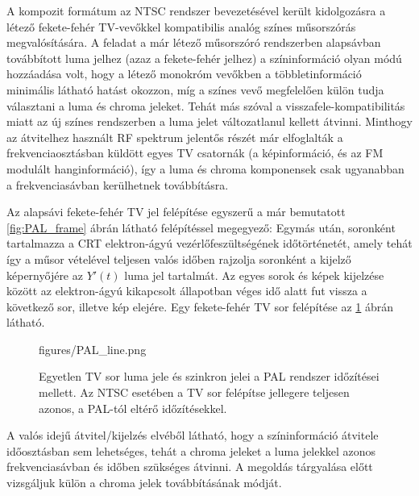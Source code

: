 A kompozit formátum az NTSC rendszer bevezetésével került kidolgozásra a létező fekete-fehér TV-vevőkkel kompatibilis analóg színes műsorszórás megvalósítására.
A feladat a már létező műsorszóró rendszerben alapsávban továbbított luma jelhez (azaz a fekete-fehér jelhez) a színinformáció olyan módú hozzáadása volt, hogy a létező monokróm vevőkben a többletinformáció minimális látható hatást okozzon, míg a színes vevő megfelelően külön tudja választani a luma és chroma jeleket.
Tehát más szóval a visszafele-kompatibilitás miatt az új színes rendszerben a luma jelet változatlanul kellett átvinni. 
Minthogy az átvitelhez használt RF spektrum jelentős részét már elfoglalták a frekvenciaosztásban küldött egyes TV csatornák (a képinformáció, és az FM modulált hanginformáció), így a luma és chroma komponensek csak ugyanabban a frekvenciasávban kerülhetnek továbbításra.

Az alapsávi fekete-fehér TV jel felépítése egyszerű a már bemutatott \ref{fig:PAL_frame} ábrán látható felépítéssel megegyező:
Egymás után, soronként tartalmazza a CRT elektron-ágyú vezérlőfeszültségének időtörténetét, amely tehát így a műsor vételével teljesen valós időben rajzolja soronként a kijelző képernyőjére az $Y'(t)$ luma jel tartalmát.
Az egyes sorok és képek kijelzése között az elektron-ágyú kikapcsolt állapotban véges idő alatt fut vissza a következő sor, illetve kép elejére. 
Egy fekete-fehér TV sor felépítése az \ref{Fig:PAL_line} ábrán látható.

%
\begin{figure}[]
	\centering
	\begin{minipage}[c]{0.65\textwidth}
	\begin{overpic}[width = 0.95\columnwidth ]{figures/PAL_line.png}
	\end{overpic} \end{minipage}\hfill
	\begin{minipage}[c]{0.35\textwidth}	\caption{Egyetlen TV sor luma jele és szinkron jelei a PAL rendszer időzítései mellett. Az NTSC esetében a TV sor felépítse jellegere teljesen azonos, a PAL-tól eltérő időzítésekkel.}
	\label{Fig:PAL_line}  \end{minipage}
\end{figure}
%

A valós idejű átvitel/kijelzés elvéből látható, hogy a színinformáció átvitele időosztásban sem lehetséges, tehát a chroma jeleket a luma jelekkel azonos frekvenciasávban és időben szükséges átvinni.
A megoldás tárgyalása előtt vizsgáljuk külön a chroma jelek továbbításának módját.

